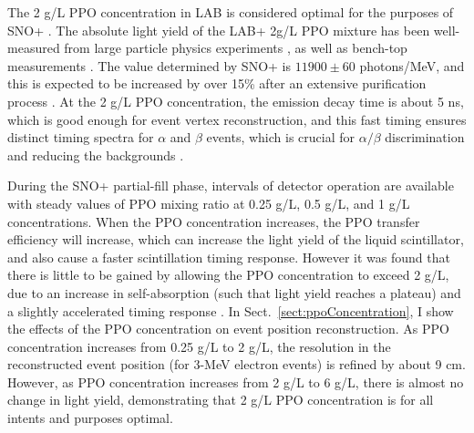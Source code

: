 The 2 g/L PPO concentration in LAB is considered optimal for the purposes of SNO+ \cite{whitepaper}. The absolute light yield of the LAB+ 2g/L PPO mixture has been well-measured from large particle physics experiments \cite{agostini2018comprehensive,xing2015preliminary}, as well as bench-top measurements \cite{xing2015preliminary,kaptanoglu2019cherenkov, novikov}. The value determined by SNO+ is $11900\pm 60$ photons/MeV, and this is expected to be increased by over 15\% after an extensive purification process \cite{snop_jinst,grullon2014light}. At the 2 g/L PPO concentration, the emission decay time is about 5 ns, which is good enough for event vertex reconstruction, and this fast timing ensures distinct timing spectra for $\alpha$ and $\beta$ events, which is crucial for $\alpha/\beta$ discrimination and reducing the backgrounds \cite{snop_jinst}. 

During the SNO+ partial-fill phase, intervals of detector operation are available with steady values of PPO mixing ratio at 0.25 g/L, 0.5 g/L, and 1 g/L concentrations. When the PPO concentration increases, the PPO transfer efficiency will increase, which can increase the light yield of the liquid scintillator, and also cause a faster scintillation timing response. However it was found that there is little to be gained by allowing the PPO concentration to exceed 2 g/L, due to an increase in self-absorption (such that light yield reaches a plateau) and a slightly accelerated timing response \cite{snop_jinst,collaboration2020development}. In Sect.~\ref{sect:ppoConcentration}, I show the effects of the PPO concentration on event position reconstruction. As PPO concentration increases from 0.25 g/L to 2 g/L, the resolution in the reconstructed event position (for 3-MeV electron events) is refined by about 9 cm. However, as PPO concentration increases from 2 g/L to 6 g/L, there is almost no change in light yield, demonstrating that 2 g/L PPO concentration is for all intents and purposes optimal.

